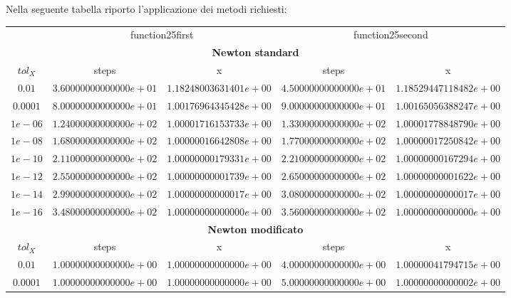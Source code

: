 Nella seguente tabella riporto l'applicazione dei metodi richiesti:
\begin{center}
\begin{tabular}{|c|c|c||c|c|}
 \multicolumn{1}{c}{} & 
 \multicolumn{2}{c}{function25first} &
 \multicolumn{2}{c}{function25second}
 \\
\cline{2-5}
	\multicolumn{5}{c}{\textbf{Newton standard}} \\
\hline
	$tol_{X}$ & steps & x & steps & x \\
\hline
	$0.01$ & $3.60000000000000e+01$ & $1.18248003631401e+00$ &
	$4.50000000000000e+01$ & $1.18529447118482e+00$ \\
		
	$0.0001$ & $8.00000000000000e+01$ & $1.00176964345428e+00$ & 
	$9.00000000000000e+01$ & $1.00165056388247e+00$ \\

	$1e-06$ & $1.24000000000000e+02$ & $1.00001716153733e+00$ &
	$1.33000000000000e+02$ & $1.00001778848790e+00$ \\

	$1e-08$ & $1.68000000000000e+02$ & $1.00000016642808e+00$ & 
	$1.77000000000000e+02$ & $1.00000017250842e+00$ \\ 

	$1e-10$ & $2.11000000000000e+02$ & $1.00000000179331e+00$ & 
	$2.21000000000000e+02$ & $1.00000000167294e+00$ \\

	$1e-12$ & $2.55000000000000e+02$ & $1.00000000001739e+00$ & 
	$2.65000000000000e+02$ & $1.00000000001622e+00$ \\

	$1e-14$ & $2.99000000000000e+02$ & $1.00000000000017e+00$ &
	$3.08000000000000e+02$ & $1.00000000000017e+00$ \\

	$1e-16$ & $3.48000000000000e+02$ & $1.00000000000000e+00$ & 
	$3.56000000000000e+02$ & $1.00000000000000e+00$ \\ 
\hline
	\multicolumn{5}{c}{\textbf{Newton modificato}} \\
\hline
	$tol_{X}$ & steps & x & steps & x \\
\hline
	$0.01$ & $1.00000000000000e+00$ & $1.00000000000000e+00$ &
	$4.00000000000000e+00$ & $1.00000041794715e+00$ \\
		
	$0.0001$ & $1.00000000000000e+00$ & $1.00000000000000e+00$ & 
	$5.00000000000000e+00$ & $1.00000000000002e+00$ \\


\end{tabular}
\end{center}
